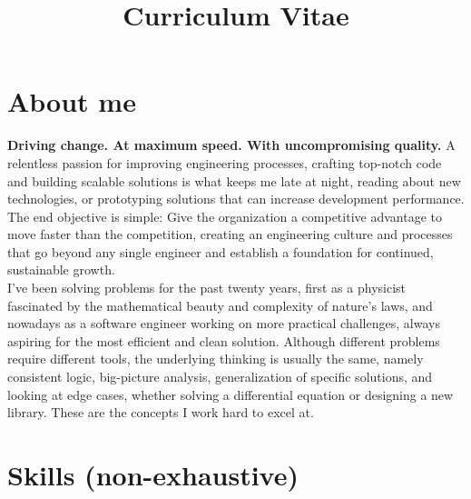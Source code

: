 \documentclass[11pt,a4paper,sans]{moderncv}        %
\title{Curriculum Vitae}                               %
\begin{document}
\makecvtitle

\section{About me}

\textbf{Driving change. At maximum speed. With uncompromising quality.} A relentless passion for improving engineering processes, crafting top-notch code and building scalable solutions is
what keeps me late at night, reading about new technologies, or prototyping solutions that can increase development performance. The end objective is simple: Give the organization a competitive advantage to move
faster than the competition, creating an engineering culture and processes that go beyond any single engineer and establish a foundation for continued, sustainable growth. \\

I've been solving problems for the past twenty years, first as a physicist fascinated by the mathematical beauty and complexity of nature's laws, and nowadays as a software
engineer working on more practical challenges, always aspiring for the most efficient and clean solution. Although different problems require different tools, the underlying thinking
is usually the same, namely consistent logic, big-picture analysis, generalization of specific solutions, and looking at edge cases, whether solving a
differential equation or designing a new library. These are the concepts I work hard to excel at.

\nopagebreak[4]

\section{Skills (non-exhaustive)}



\end{document}

